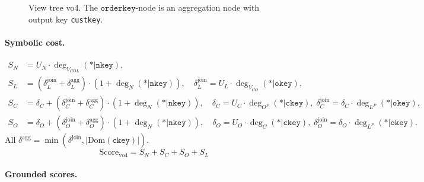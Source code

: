 \begin{figure}[ht]
\centering
{}
\caption{View tree vo4. The $\texttt{orderkey}$-node is an aggregation node with output key \texttt{custkey}.}
\label{fig:vo4}
\end{figure}

\paragraph{Symbolic cost.}
\begin{align*}
S_N &= U_N \cdot \deg_{V_{COL}}(*|\texttt{nkey}), \\[4pt]
S_L &= (\delta^{\mathrm{join}}_L + \delta^{\mathrm{agg}}_L) \cdot (1 + \deg_N(*|\texttt{nkey})),
\quad \delta^{\mathrm{join}}_L = U_L \cdot \deg_{V_{CO}}(*|\texttt{okey}),\\[4pt]
S_C &= \delta_C + (\delta^{\mathrm{join}}_C + \delta^{\mathrm{agg}}_C) \cdot (1 + \deg_N(*|\texttt{nkey})),
\quad \delta_C = U_C \cdot \deg_{O^P}(*|\texttt{ckey}),\;
\delta^{\mathrm{join}}_C = \delta_C \cdot \deg_{L^P}(*|\texttt{okey}),\\[4pt]
S_O &= \delta_O + (\delta^{\mathrm{join}}_O + \delta^{\mathrm{agg}}_O) \cdot (1 + \deg_N(*|\texttt{nkey})),
\quad \delta_O = U_O \cdot \deg_C(*|\texttt{ckey}),\;
\delta^{\mathrm{join}}_O = \delta_O \cdot \deg_{L^P}(*|\texttt{okey}).
\end{align*}
All $\delta^{\mathrm{agg}} = \min(\delta^{\mathrm{join}}, |\mathrm{Dom}(\texttt{ckey})|)$.
\[
\boxed{\mathrm{Score}_{\mathrm{vo4}} = S_N + S_C + S_O + S_L}
\]

\paragraph{Grounded scores.}

